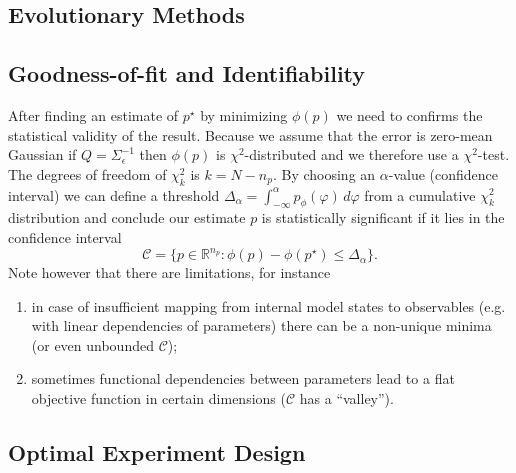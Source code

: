 \documentclass[a4paper]{article}
\theoremstyle{plain}
\theoremstyle{definition}
\theoremstyle{remark}
\begin{document}
\subsection{Evolutionary Methods}


\subsection{Goodness-of-fit and Identifiability}

After finding an estimate of $p^\star$ by minimizing $\phi(p)$ we need to
confirms the statistical validity of the result. Because we assume that the
error is zero-mean Gaussian if $Q = \Sigma_\epsilon^{-1}$ then $\phi(p)$ is
$\chi^2$-distributed and we therefore use a $\chi^2$-test. The degrees of
freedom of $\chi^2_k$ is $k = N - n_p$. By choosing an $\alpha$-value
(confidence interval) we can define a threshold $\Delta_\alpha =
\int_{-\infty}^\alpha p_\phi(\varphi) \, d\varphi$ from a
cumulative $\chi_k^2$ distribution and conclude our estimate $p$ is
statistically significant if it lies in the confidence interval
\[
  \mathcal{C} =
  \{ p \in \mathbb{R}^{n_p} : \phi(p) - \phi(p^\star) \leq \Delta_\alpha \}.
\]
Note however that there are limitations, for instance
\begin{enumerate}
  \item in case of insufficient mapping from internal model states to
    observables (e.g. with linear dependencies of parameters) there can be a
    non-unique minima (or even unbounded $\mathcal{C}$);
  \item sometimes functional dependencies between parameters lead to a flat
    objective function in certain dimensions ($\mathcal{C}$ has a ``valley'').
\end{enumerate}

\subsection{Optimal Experiment Design}
\end{document}
